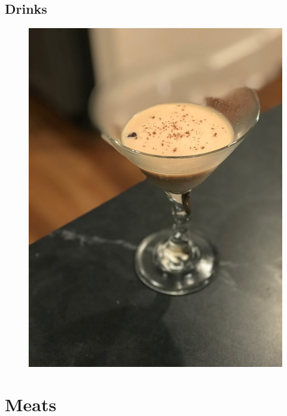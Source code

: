 \documentclass[11pt]{report}
\begin{document}
\chapter{Drinks}
\begin{figure}[h]
\begin{center}
   \includegraphics[width=0.65\linewidth]{images/IMG_2914.jpg}
\end{center}
\end{figure}
\newpage





\part{Meats}
\end{document}
